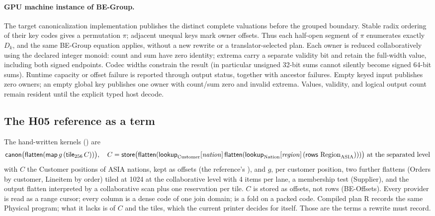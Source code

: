\paragraph{GPU machine instance of BE-Group.}
The target canonicalization implementation publishes the distinct complete valuations
before the grouped boundary. Stable radix ordering of their key codes gives
a permutation $\pi$; adjacent unequal keys mark owner offsets. Thus each
half-open segment of $\pi$ enumerates exactly $D_k$, and the same BE-Group
equation applies, without a new rewrite or a translator-selected plan.
Each owner is reduced collaboratively using the declared integer monoid:
count and sum have zero identity; extrema carry a separate validity bit
and retain the full-width value, including both signed endpoints.
Codec widths constrain the result (in particular unsigned 32-bit sums
cannot silently become signed 64-bit sums). Runtime capacity or offset failure
is reported through output status, together with ancestor failures.
Empty keyed input publishes zero owners; an empty global key publishes one
owner with count/sum zero and invalid extrema. Values, validity, and logical
output count remain resident until the explicit typed host decode.

\subsection{The H05 reference as a term}
The hand-written kernels () are
\[
 \mathsf{canon}\big(\mathsf{flatten}(\mathsf{map}\,g\,(\mathsf{tile}_{256}\,C))\big),\quad
 C=\mathsf{store}\big(\mathsf{flatten}(\mathsf{lookup}_{\rm Customer}[\mathit{nation}]\,
 \mathsf{flatten}(\mathsf{lookup}_{\rm Nation}[\mathit{region}]\,(\mathsf{rows}\ \mathrm{Region}_{\rm ASIA})))\big)\text{ at the separated level}
\]
with $C$ the Customer positions of ASIA nations, kept as offsets (the
reference's ), and $g$, per customer position, two further
flattens (Orders by customer, Lineitem by order) tiled at 1024 at the collaborative level with 4 items
per lane, a membership test (Supplier), and the output flatten interpreted
by a collaborative scan plus one reservation per tile. $C$ is stored as
offsets, not rows (BE-Offsets). Every provider is read as a range cursor;
every column is a dense code of one join domain;  is a fold on
a packed code. Compiled plan R records the same Physical program; what it
lacks is  of $C$ and the tiles, which the current printer
decides for itself. Those are the terms a rewrite must record.

